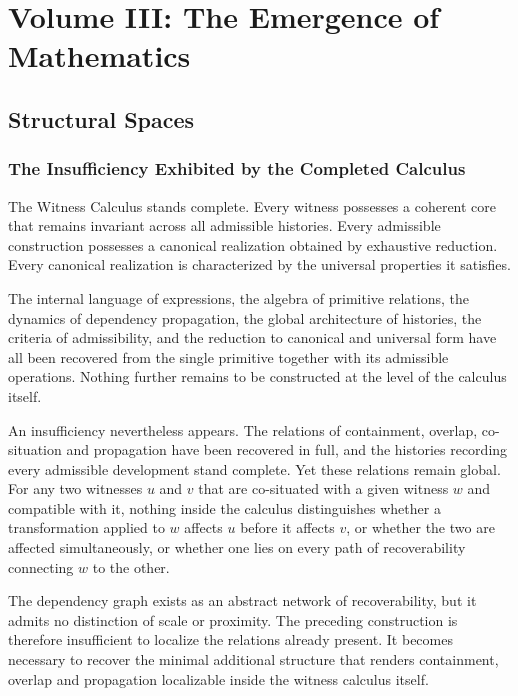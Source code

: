 \documentclass[12pt,anyside]{book}
\begin{document}
\mainmatter

\part*{Volume III: The Emergence of Mathematics}

\chapter{Structural Spaces}

\section{The Insufficiency Exhibited by the Completed Calculus}
The Witness Calculus stands complete. Every witness possesses a coherent core that remains invariant across all admissible histories. Every admissible construction possesses a canonical realization obtained by exhaustive reduction. Every canonical realization is characterized by the universal properties it satisfies. 

The internal language of expressions, the algebra of primitive relations, the dynamics of dependency propagation, the global architecture of histories, the criteria of admissibility, and the reduction to canonical and universal form have all been recovered from the single primitive together with its admissible operations. Nothing further remains to be constructed at the level of the calculus itself.

An insufficiency nevertheless appears. The relations of containment, overlap, co-situation and propagation have been recovered in full, and the histories recording every admissible development stand complete. Yet these relations remain global. For any two witnesses $u$ and $v$ that are co-situated with a given witness $w$ and compatible with it, nothing inside the calculus distinguishes whether a transformation applied to $w$ affects $u$ before it affects $v$, or whether the two are affected simultaneously, or whether one lies on every path of recoverability connecting $w$ to the other. 

The dependency graph exists as an abstract network of recoverability, but it admits no distinction of scale or proximity. The preceding construction is therefore insufficient to localize the relations already present. It becomes necessary to recover the minimal additional structure that renders containment, overlap and propagation localizable inside the witness calculus itself.
\end{document}
